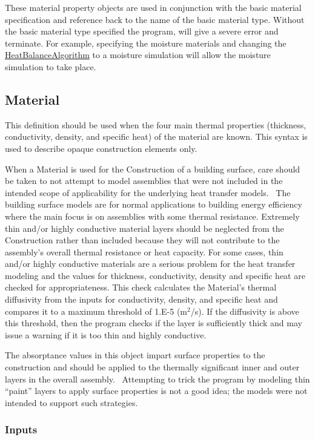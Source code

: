 These material property objects are used in conjunction with the basic material specification and reference back to the name of the basic material type. Without the basic material type specified the program, will give a severe error and terminate. For example, specifying the moisture materials and changing the \hyperref[heatbalancealgorithm]{HeatBalanceAlgorithm} to a moisture simulation will allow the moisture simulation to take place.

\subsection{Material}\label{material}

This definition should be used when the four main thermal properties (thickness, conductivity, density, and specific heat) of the material are known. This syntax is used to describe opaque construction elements only.

When a Material is used for the Construction of a building surface, care should be taken to not attempt to model assemblies that were not included in the intended scope of applicability for the underlying heat transfer models.~ The building surface models are for normal applications to building energy efficiency where the main focus is on assemblies with some thermal resistance. Extremely thin and/or highly conductive material layers should be neglected from the Construction rather than included because they will not contribute to the assembly's overall thermal resistance or heat capacity. For some cases, thin and/or highly conductive materials are a serious problem for the heat transfer modeling and the values for thickness, conductivity, density and specific heat are checked for appropriateness. This check calculates the Material's thermal diffusivity from the inputs for conductivity, density, and specific heat and compares it to a maximum threshold of 1.E-5 (m\(^{2}\)/s). If the diffusivity is above this threshold, then the program checks if the layer is sufficiently thick and may issue a warning if it is too thin and highly conductive.

The absorptance values in this object impart surface properties to the construction and should be applied to the thermally significant inner and outer layers in the overall assembly.~ Attempting to trick the program by modeling thin ``paint'' layers to apply surface properties is not a good idea; the models were not intended to support such strategies.

\subsubsection{Inputs}\label{inputs-046}

